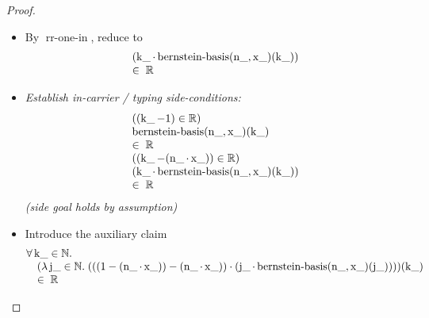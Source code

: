 \documentclass[11pt]{article}
\theoremstyle{plain}
\begin{document}
\begin{proof}
\begin{itemize}[leftmargin=2.8em, itemsep=4pt, parsep=1pt]
  \item[\textbf{35}] By $\operatorname{rr\text{-}one\text{-}in}$, reduce to
\begin{equation*}
\begin{array}{@{}l@{}} (\operatorname{k\_} \cdot \operatorname{bernstein\text{-}basis}(\operatorname{n\_}, \operatorname{x\_})(\operatorname{k\_})) \\ \in\; \mathbb{R} \end{array}
\end{equation*}

  \item[\textbf{36--40}] \emph{Establish in-carrier / typing side-conditions:}
\begin{equation*}
\begin{array}{@{}l@{}}
((\operatorname{k\_} - 1) \in \mathbb{R}) \\
\begin{array}{@{}l@{}} \operatorname{bernstein\text{-}basis}(\operatorname{n\_}, \operatorname{x\_})(\operatorname{k\_}) \\ \in\; \mathbb{R} \end{array} \\
((\operatorname{k\_} - (\operatorname{n\_} \cdot \operatorname{x\_})) \in \mathbb{R}) \\
\begin{array}{@{}l@{}} (\operatorname{k\_} \cdot \operatorname{bernstein\text{-}basis}(\operatorname{n\_}, \operatorname{x\_})(\operatorname{k\_})) \\ \in\; \mathbb{R} \end{array}
\end{array}
\end{equation*}
  \emph{(side goal holds by assumption)}
  \item[\textbf{41}] Introduce the auxiliary claim
\begin{equation*}
\begin{array}{@{}l@{}} \forall \operatorname{k\_} \in \mathbb{N}. \\ \quad (\lambda \operatorname{j\_} \in \mathbb{N}.\; (((1 - (\operatorname{n\_} \cdot \operatorname{x\_})) - (\operatorname{n\_} \cdot \operatorname{x\_})) \cdot (\operatorname{j\_} \cdot \operatorname{bernstein\text{-}basis}(\operatorname{n\_}, \operatorname{x\_})(\operatorname{j\_}))))(\operatorname{k\_}) \\ \quad \in\; \mathbb{R} \end{array}
\end{equation*}


\end{itemize}
\end{proof}
\end{document}
